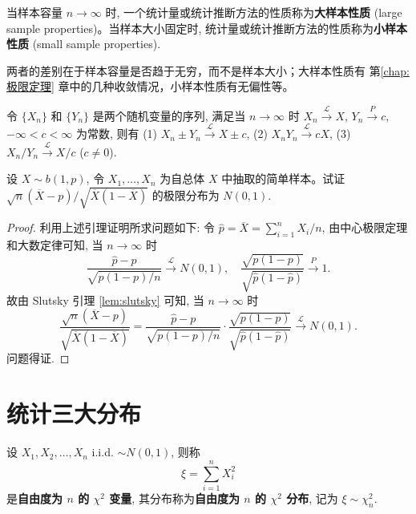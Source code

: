 \begin{definition}[大样本与小样本性质] \label{def:large_small_sample_properties}
当样本容量 $n \to \infty$ 时, 一个统计量或统计推断方法的性质称为\textbf{大样本性质} (large sample properties)。当样本大小固定时, 统计量或统计推断方法的性质称为\textbf{小样本性质} (small sample properties).
\end{definition}
\begin{remark}
    两者的差别在于样本容量是否趋于无穷，而不是样本大小；大样本性质有 第\ref{chap:极限定理} 章中的几种收敛情况，小样本性质有无偏性等。
\end{remark}
\begin{lemma}[Slutsky引理] \label{lem:slutsky}
令 $\{X_n\}$ 和 $\{Y_n\}$ 是两个随机变量的序列, 满足当 $n \to \infty$ 时 $X_n \xrightarrow{\mathscr{L}} X$, $Y_n \xrightarrow{P} c$, $-\infty < c < \infty$ 为常数, 则有
(1) $X_n \pm Y_n \xrightarrow{\mathscr{L}} X \pm c$,
(2) $X_n Y_n \xrightarrow{\mathscr{L}} cX$,
(3) $X_n / Y_n \xrightarrow{\mathscr{L}} X/c$ ($c \ne 0$).
\end{lemma}

\begin{example}\label{ex:binomial_sample_mean_limit_distribution}
设 $X \sim b(1,p)$, 令 $X_1, \ldots, X_n$ 为自总体 $X$ 中抽取的简单样本。试证 $\sqrt{n}(\overline{X}-p)/\sqrt{\overline{X}(1-\overline{X})}$ 的极限分布为 $N(0,1)$.
\end{example}

\begin{proof}
利用上述引理证明所求问题如下: 令 $\hat{p} = \overline{X} = \sum_{i=1}^n X_i/n$, 由中心极限定理和大数定律可知, 当 $n \to \infty$ 时
\[
\frac{\hat{p}-p}{\sqrt{p(1-p)/n}} \xrightarrow{\mathscr{L}} N(0,1), \quad \frac{\sqrt{p(1-p)}}{\sqrt{\hat{p}(1-\hat{p})}} \xrightarrow{P} 1.
\]
故由 Slutsky 引理 \ref{lem:slutsky} 可知, 当 $n \to \infty$ 时
\[
\frac{\sqrt{n}(\overline{X}-p)}{\sqrt{\overline{X}(1-\overline{X})}} = \frac{\hat{p}-p}{\sqrt{p(1-p)/n}} \cdot \frac{\sqrt{p(1-p)}}{\sqrt{\hat{p}(1-\hat{p})}} \xrightarrow{\mathscr{L}} N(0,1).
\]
问题得证.
\end{proof}
\section{统计三大分布}\label{sec:统计三大分布}

\begin{definition}[$\chi^2$ 分布] \label{def:chi_squared_distribution}
设 $X_1,X_2,\ldots,X_n$ i.i.d. $\sim N(0,1)$, 则称
\[
\xi = \sum_{i=1}^n X_i^2
\]
是\textbf{自由度为 $n$ 的 $\chi^2$ 变量}, 其分布称为\textbf{自由度为 $n$ 的 $\chi^2$ 分布}, 记为 $\xi \sim \chi_n^2$.
\end{definition}

